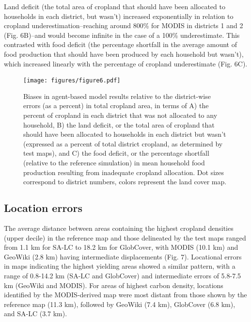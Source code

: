 \documentclass[a4paper]{article}
\begin{document}
Land deficit (the total area of cropland that should have been allocated to households in each district, but wasn't) increased exponentially in relation to cropland underestimation--reaching around 800\% for MODIS in districts 1 and 2 (Fig. 6B)--and would become infinite in the case of a 100\% underestimate. This contrasted with food deficit (the percentage shortfall in the average amount of food production that should have been produced by each household but wasn't), which increased linearly with the percentage of cropland underestimate (Fig. 6C). 


\begin{figure}[ht]
\centerline{\texttt{[image: figures/figure6.pdf]}}
\caption{Biases in agent-based model results relative to the district-wise errors (as a percent) in total cropland area, in terms of A) the percent of cropland in each district that was not allocated to any household, B) the land deficit, or the total area of cropland that should have been allocated to households in each district but wasn't (expressed as a percent of total district cropland, as determined by test maps), and C) the food deficit, or the percentage shortfall (relative to the reference simulation) in mean household food production resulting from inadequate cropland allocation. Dot sizes correspond to district numbers, colors represent the land cover map.}
\label{afoto}
\end{figure}

\vspace{-0.3 cm}
\subsection*{Location errors}
\vspace{-0.2 cm}
The average distance between areas containing the highest cropland densities (upper decile) in the reference map and those delineated by the test maps ranged from 1.1 km for SA-LC to 18.2 km for GlobCover, with MODIS (10.1 km) and GeoWiki (2.8 km) having intermediate displacements (Fig. 7). Locational errors in maps indicating the highest yielding areas showed a similar pattern, with a range of 0.8-14.2 km (SA-LC and GlobCover) and intermediate errors of 5.8-7.5 km (GeoWiki and MODIS). For areas of highest carbon density, locations identified by the MODIS-derived map were most distant from those shown by the reference map (11.3 km), followed by GeoWiki (7.4 km), GlobCover (6.8 km), and SA-LC (3.7 km).   
\end{document}
